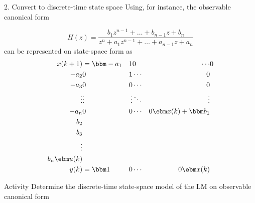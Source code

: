 \documentclass[presentation,aspectratio=169]{beamer}
\begin{document}
\begin{frame}[label={sec:org34a31b1}]{2. Convert to discrete-time state space}
Using, for instance, the \alert{observable canonical form}

\begin{equation*}
H(z)=\frac{b_1z^{n-1}+\dots+b_{n-1}z+b_n}{z^n+a_1z^{n-1}+\dots
  +a_{n-1}z+a_n}
\end{equation*}
can be represented on state-space form as
\begin{align*}
x(k+1)&=\bbm -a_1& 1& 0 &\cdots &  0\\
-a_2 & 0& 1 &  \cdots& 0\\
-a_3 & 0 & 0& \cdots & 0\\
\vdots& \vdots& \vdots & \ddots& \vdots\\
-a_n& 0& 0 & \cdots& 0\ebm x(k) +
\bbm b_1\\ b_2\\ b_3\\ \vdots\\ b_n\ebm u(k)\\
y(k) &=\bbm 1& 0& \cdots& 0 \ebm x(k)
\end{align*}

\pause

\alert{Activity} Determine the discrete-time state-space model of the LM on observable canonical form
\end{frame}
\end{document}
